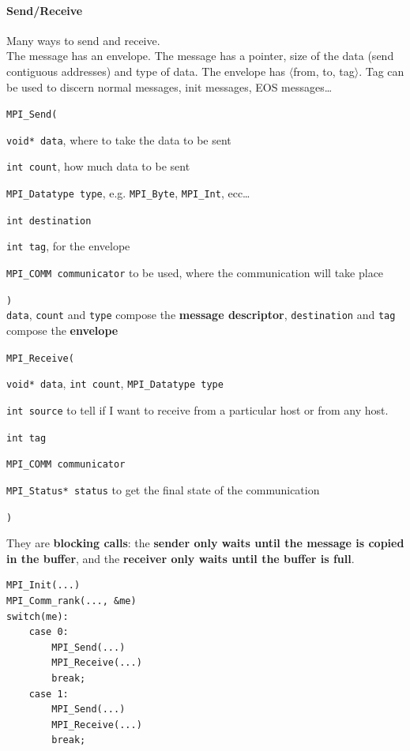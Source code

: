 \documentclass[10pt]{report}
\begin{document}
\paragraph{Send/Receive} Many ways to send and receive.\\
The message has an envelope. The message has a pointer, size of the data (send contiguous addresses) and type of data. The envelope has $\langle$from, to, tag$\rangle$. Tag can be used to discern normal messages, init messages, EOS messages\ldots
\begin{list}{}{}
	\item \texttt{MPI\_Send(}
	\begin{list}{}{}
		\item \texttt{void* data}, where to take the data to be sent
		\item \texttt{int count}, how much data to be sent
		\item \texttt{MPI\_Datatype type}, e.g. \texttt{MPI\_Byte}, \texttt{MPI\_Int}, ecc\ldots
		\item \texttt{int destination}
		\item \texttt{int tag}, for the envelope
		\item \texttt{MPI\_COMM communicator} to be used, where the communication will take place
	\end{list}
	\texttt{)}\\
	\texttt{data}, \texttt{count} and \texttt{type} compose the \textbf{message descriptor}, \texttt{destination} and \texttt{tag} compose the \textbf{envelope} 
	\pagebreak
	\item \texttt{MPI\_Receive(}
	\begin{list}{}{}
		\item \texttt{void* data}, \texttt{int count}, \texttt{MPI\_Datatype type}
		\item \texttt{int source} to tell if I want to receive from a particular host or from any host.
		\item \texttt{int tag}
		\item \texttt{MPI\_COMM communicator}
		\item \texttt{MPI\_Status* status} to get the final state of the communication
	\end{list}
	\texttt{)}
\end{list}
They are \textbf{blocking calls}: the \textbf{sender only waits until the message is copied in the buffer}, and the \textbf{receiver only waits until the buffer is full}.
\begin{lstlisting}[style=myC]
MPI_Init(...)
MPI_Comm_rank(..., &me)
switch(me):
	case 0:
		MPI_Send(...)
		MPI_Receive(...)
		break;
	case 1:
		MPI_Send(...)
		MPI_Receive(...)
		break;
\end{lstlisting}
\end{document}
